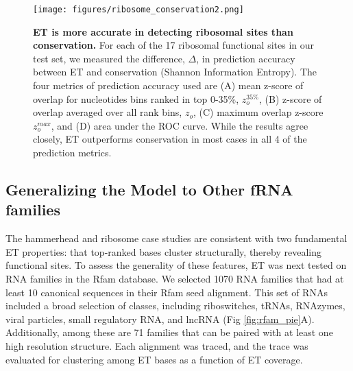 \documentclass[12pt,a4paper]{report}
\begin{document}
\begin{figure}
\begin{minipage}[c][\textheight]{\textwidth}
\centering
 \vspace{-0.5in}
  \texttt{[image: figures/ribosome\_conservation2.png]}
\caption[ET is more accurate in detecting ribosomal sites than conservation.]{\textbf{ET is more accurate in detecting ribosomal sites than conservation.} For each of the 17 ribosomal functional sites in our test set, we measured the difference, $\Delta$, in prediction accuracy between ET and conservation (Shannon Information Entropy). The four metrics of prediction accuracy used are (A) mean z-score of overlap for nucleotides bins ranked in top 0-35\%, $z_{o}^{35\%}$, (B) z-score of overlap averaged over all rank bins, $z_{o}$, (C) maximum overlap z-score $z_{o}^{max}$, and (D) area under the ROC curve. While the results agree closely, ET outperforms conservation in most cases in all 4 of the prediction metrics.
}
\label{fig:ribosome_conservation}
\end{minipage}
\end{figure}

\subsection{Generalizing the Model to Other fRNA families}
The hammerhead and ribosome case studies are consistent with two fundamental ET properties: that top-ranked bases cluster structurally, thereby revealing functional sites. To assess the generality of these features, ET was next tested on RNA families in the Rfam database. We selected 1070 RNA families that had at least 10 canonical sequences in their Rfam seed alignment. This set of RNAs included a broad selection of classes, including riboswitches, tRNAs, RNAzymes, viral particles, small regulatory RNA, and lncRNA (Fig \ref{fig:rfam_pie}A). Additionally, among these are 71 families that can be paired with at least one high resolution structure. Each alignment was traced, and the trace was evaluated for clustering among ET bases as a function of ET coverage. 
\end{document}
